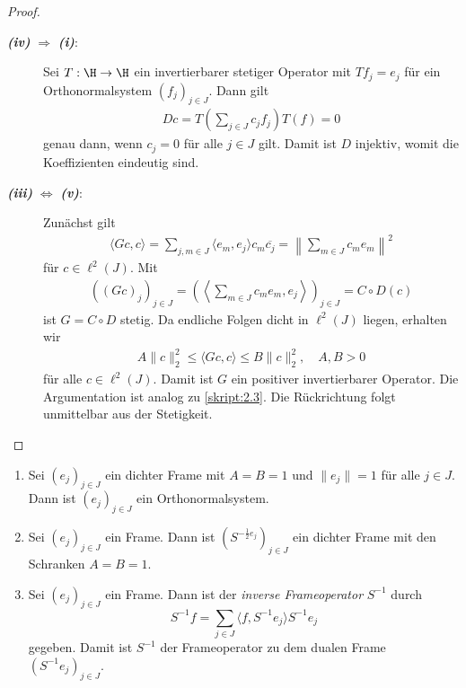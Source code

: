 \begin{proof}
\begin{description}
		\item[
		\textbf{\textit{ \itshape\textrm{(iv)}}} 
		$ \Rightarrow $ \textbf{\textit{\textrm{(i)}}}:]
		Sei $ T : \H \to \H $ ein invertierbarer stetiger Operator mit $ T f_j = e_j $ für ein Orthonormalsystem $ (f_j)_{j \in J} $.
		Dann gilt 
		\begin{align*}
		D c = 
		T \left( \sum \limits_{j \in J} c_j f_j\right) T(f) = 0
		\end{align*}
		genau dann, wenn $ c_j = 0 $ für alle $ j \in J $ gilt.
		Damit ist $ D $ injektiv, womit die Koeffizienten eindeutig sind.
		
		\item[
		\textbf{\textit{ \itshape\textrm{(iii)}}} 
		$ \Leftrightarrow $ \textbf{\textit{\textrm{(v)}}}:]
		Zunächst gilt
		\begin{align*}
		\langle Gc ,c \rangle
		=
		\sum \limits_{j,m \in J} \langle e_m, e_j \rangle c_m \overline{c_j}
		=
		\left\| \sum \limits_{m \in J} c_m e_m \right\|^2 
		\end{align*}
		für $ c \in \ell^2(J) $.
		Mit 
		\begin{align*}
		((Gc)_j)_{j \in J}
		= \left( \left\langle \sum \limits_{m \in J } c_m e_m , e_j \right\rangle\right)_{j \in J}
		=C \circ D (c) 
		\end{align*}
		ist $ G = C \circ D $ stetig. Da endliche Folgen dicht in $ \ell^2(J) $ liegen, erhalten wir 
		\begin{align*}
		A \|  c \|^2_2 \leq \langle Gc,c \rangle \leq B \| c \|_2^2,\quad   A,B > 0 
		\end{align*}
		für alle $ c \in \ell^2(J) $. Damit ist $ G $ ein positiver invertierbarer Operator.
		Die Argumentation ist analog zu \ref{skript:2.3}.
		Die Rückrichtung folgt unmittelbar aus der Stetigkeit.
	\end{description}
\end{proof}


\begin{lem}
	\begin{enumerate}
		\item
		Sei $ (e_j)_{j \in J} $ ein dichter Frame mit $ A = B = 1 $ und $ \|e_j \| = 1 $ für alle $ j \in J $.
		Dann ist $ (e_j)_{j \in J} $ ein Orthonormalsystem.
		
		\item
		Sei $ (e_j)_{j \in J} $ ein Frame.
		Dann ist $ (S^{-\frac{1}{2} e_j})_{j \in J} $ ein dichter Frame mit den Schranken $ A = B = 1 $.
		
		\item 
		Sei $ (e_j)_{j \in J} $ ein Frame.
		Dann ist der \textit{inverse Frameoperator} $ S^{-1} $ durch
		\begin{equation}
		S^{-1} f
		=
		\sum \limits_{j \in J} \langle f, S^{-1} e_j \rangle S^{-1} e_j
 		\end{equation}
 		gegeben. Damit ist $ S^{-1} $ der Frameoperator zu dem dualen Frame $ (S^{-1} e_j)_{j \in J} $. 	 
	\end{enumerate}
	
	
\end{lem}

